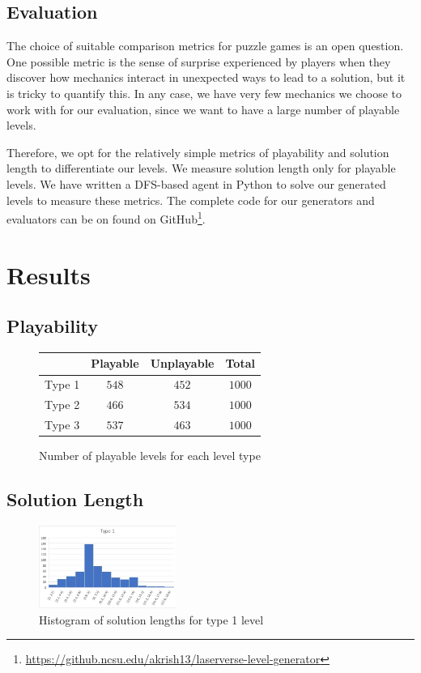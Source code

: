 \documentclass[letterpaper]{article}
\begin{document}
\subsection{Evaluation}
The choice of suitable comparison metrics for puzzle games is an open question. One possible metric is the sense of
surprise experienced by players when they discover how mechanics interact in unexpected ways to lead to a solution, but
it is tricky to quantify this. In any case, we have very few mechanics we choose to work with for our evaluation, since
we want to have a large number of playable levels.

Therefore, we opt for the relatively simple metrics of playability and solution length to differentiate our levels. We
measure solution length only for playable levels. We have written a DFS-based agent in Python to solve our generated
levels to measure these metrics. The complete code for our generators and evaluators can be on found on
GitHub\footnote{\url{https://github.ncsu.edu/akrish13/laserverse-level-generator}}.

\section{Results}

\subsection{Playability}
\begin{figure}[h]
    \centering
    \begin{tabular}{|c|c|c|c|}
        \hline
               & Playable & Unplayable & Total  \\
        \hline
        Type 1 & $548$    & $452$      & $1000$ \\
        \hline
        Type 2 & $466$    & $534$      & $1000$ \\
        \hline
        Type 3 & $537$    & $463$      & $1000$ \\
        \hline
    \end{tabular}
    \caption{Number of playable levels for each level type}
    \label{tab:playable}
\end{figure}

\subsection{Solution Length}
\begin{figure}[h]
    \centering
    \includegraphics[width=0.4\textwidth]{crate.jpg}
    \caption{Histogram of solution lengths for type 1 level}
    \label{fig:crate}
\end{figure}
\end{document}
